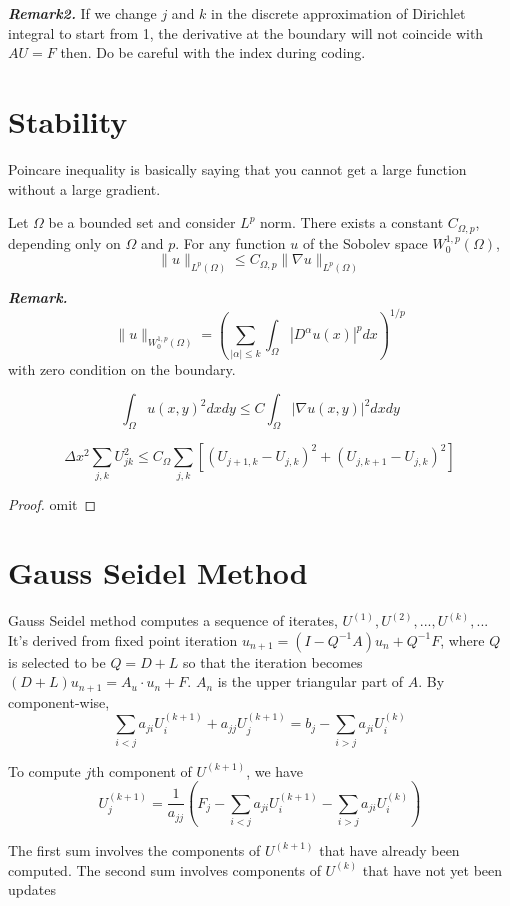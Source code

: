 	\noindent\textbf{\textit{Remark2.}} If we change $j$ and $k$ in the discrete approximation of Dirichlet integral to start from 1, the derivative at the boundary will not coincide with $AU = F$ then. Do be careful with the index during coding.
	
	
	\section{Stability}
	
	Poincare inequality is basically saying that you cannot get a large function without a large gradient.
	
	\begin{theorem} Let $\Omega$ be a bounded set and consider $L^p$ norm. There exists a constant $C_{\Omega, p}$, depending only on $\Omega$ and $p$. For any function $u$ of the Sobolev space $W_0^{1,p}(\Omega)$,$$\|u\|_{L^p(\Omega)} \leq C_{\Omega,p} \| \nabla u \|_{L^p(\Omega)}$$
	\end{theorem}
	
	\noindent\textbf{\textit{Remark.}} $$\|u\|_{W_0^{1,p}(\Omega)} = (\sum_{|\alpha| \leq k}\int_{\Omega}|D^{\alpha}u(x)|^pdx)^{1/p}$$
	with zero condition on the boundary.
	
	$$\int_{\Omega}u(x,y)^2dxdy \leq C \int_{\Omega}|\nabla u(x,y) |^2dxdy$$
	
	\begin{theorem}
		$$\Delta x^2 \sum_{j,k}U_{jk}^2 \leqslant C_{\Omega}\sum_{j,k}[(U_{j+1,k} - U_{j,k})^2 + (U_{j,k+1} - U_{j,k})^2]$$
	\end{theorem}
	
	\begin{proof}
		omit
	\end{proof}
	
	
	
	\section{Gauss Seidel Method}
	
	Gauss Seidel method computes a sequence of iterates, $U^{(1)}, U^{(2)}, ..., U^{(k)}, ...$ It's derived from fixed point iteration $u_{n + 1} = (I - Q^{-1}A)u_{n} + Q^{-1}F$, where $Q$ is selected to be $Q = D + L$ so that the iteration becomes $(D+L)u_{n + 1} = A_u\cdot u_n + F$. $A_n$ is the upper triangular part of $A$. By component-wise, $$\sum_{i < j}a_{ji}U_i^{(k + 1)} + a_{jj}U_j^{(k + 1)} = b_j - \sum_{i >j}a_{ji}U_i^{(k)}$$
	
	To compute $j$th component of $U^{(k + 1)}$, we have 
	\begin{equation}
		U_{j}^{(k + 1)} = \frac{1}{a_{jj}}(F_j - \sum_{i < j}a_{ji}U_i^{(k + 1)} - \sum_{i > j}a_{ji}U_i^{(k)})
	\end{equation}
	
	The first sum involves the components of $U^{(k + 1)}$ that have already been computed. The second sum involves components of $U^{(k)}$ that have not yet been updates

	


